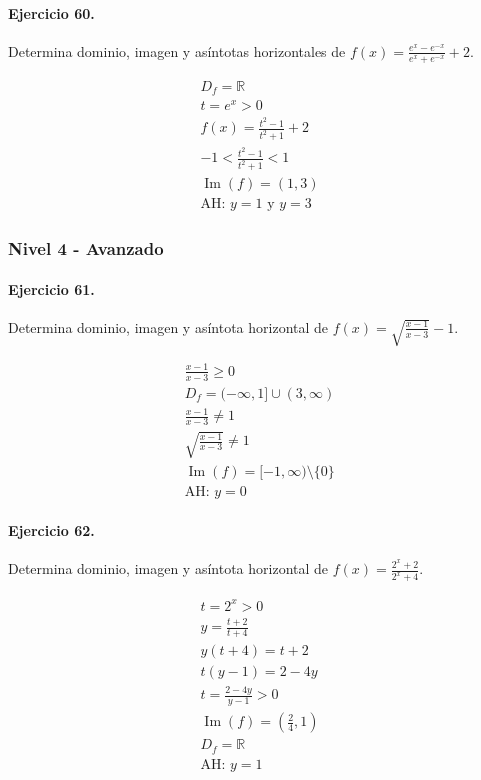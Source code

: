 \documentclass[11pt,a4paper]{article}
\begin{document}
\paragraph{Ejercicio 60.} Determina dominio, imagen y asíntotas horizontales de $f(x)=\frac{e^x-e^{-x}}{e^x+e^{-x}}+2$.

\[
\begin{aligned}
D_f=\mathbb{R}\\
t=e^x>0\\
f(x)=\frac{t^2-1}{t^2+1}+2\\
-1<\frac{t^2-1}{t^2+1}<1\\
\operatorname{Im}(f)=(1,3)\\
\text{AH: }y=1\text{ y }y=3
\end{aligned}
\]


\newpage

\subsubsection*{Nivel 4 - Avanzado}

\paragraph{Ejercicio 61.} Determina dominio, imagen y asíntota horizontal de $f(x)=\sqrt{\frac{x-1}{x-3}}-1$.

\[
\begin{aligned}
\frac{x-1}{x-3}\ge0\\
D_f=(-\infty,1]\cup(3,\infty)\\
\frac{x-1}{x-3}\ne1\\
\sqrt{\frac{x-1}{x-3}}\ne1\\
\operatorname{Im}(f)=[-1,\infty)\setminus\{0\}\\
\text{AH: }y=0
\end{aligned}
\]


\paragraph{Ejercicio 62.} Determina dominio, imagen y asíntota horizontal de $f(x)=\frac{2^x+2}{2^x+4}$. 

\[
\begin{aligned}
t=2^x>0\\
y=\frac{t+2}{t+4}\\
y(t+4)=t+2\\
t(y-1)=2-4y\\
t=\frac{2-4y}{y-1}>0\\
\operatorname{Im}(f)=(\frac{2}{4},1)\\
D_f=\mathbb{R}\\
\text{{AH: }}y=1
\end{aligned}
\]
\end{document}
